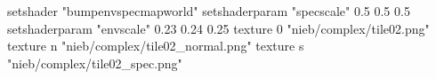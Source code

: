 setshader "bumpenvspecmapworld"
setshaderparam "specscale" 0.5 0.5 0.5
setshaderparam "envscale"  0.23 0.24 0.25
    texture 0 "nieb/complex/tile02.png"
    texture n "nieb/complex/tile02_normal.png"
    texture s "nieb/complex/tile02_spec.png"